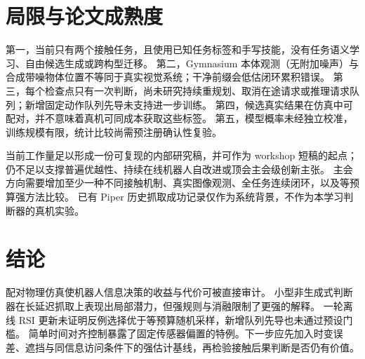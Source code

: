 \documentclass{article}
\begin{document}
\section{局限与论文成熟度}
第一，当前只有两个接触任务，且使用已知任务标签和手写技能，没有任务语义学习、自由候选生成或跨构型迁移。
第二，Gymnasium 本体观测（无附加噪声）与合成带噪物体位置不等同于真实视觉系统；干净前缀会低估闭环累积错误。
第三，每个检查点只有一次判断，尚未研究持续重规划、取消在途请求或推理请求队列；新增固定动作队列先导未支持进一步训练。
第四，候选真实结果在仿真中可配对，并不意味着真机可同成本获取这些标签。
第五，模型概率未经独立校准，训练规模有限，统计比较尚需预注册确认性复验。

当前工作量足以形成一份可复现的内部研究稿，并可作为 workshop 短稿的起点；仍不足以支撑普遍优越性、持续在线机器人自改进或顶会主会级创新主张。
主会方向需要增加至少一种不同接触机制、真实图像观测、全任务连续闭环，以及等预算强方法比较。
已有 Piper 历史抓取成功记录仅作为系统背景，不作为本学习判断器的真机实验。

\section{结论}
配对物理仿真使机器人信息决策的收益与代价可被直接审计。
小型非生成式判断器在长延迟抓取上表现出局部潜力，但强规则与消融限制了更强的解释。
一轮离线 RSI 更新未证明反例选择优于等预算随机采样，新增队列先导也未通过预设门槛。
简单时间对齐控制暴露了固定传感器偏置的特例。下一步应先加入时变误差、遮挡与同信息访问条件下的强估计基线，再检验接触后果判断是否仍有价值。


\end{document}
